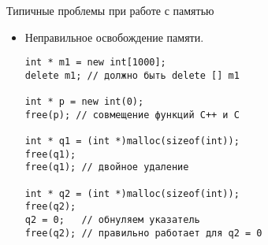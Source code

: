 \documentclass{beamer}
\begin{document}
\begin{frame}[fragile]{Типичные проблемы при работе с памятью}
    \begin{itemize}
    \item Неправильное освобождение памяти.
\begin{lstlisting}
int * m1 = new int[1000];
delete m1; // должно быть delete [] m1

int * p = new int(0);
free(p); // совмещение функций C++ и C

int * q1 = (int *)malloc(sizeof(int));
free(q1);
free(q1); // двойное удаление

int * q2 = (int *)malloc(sizeof(int));
free(q2);
q2 = 0;   // обнуляем указатель
free(q2); // правильно работает для q2 = 0
\end{lstlisting}
\end{itemize}
\end{frame}
\end{document}
